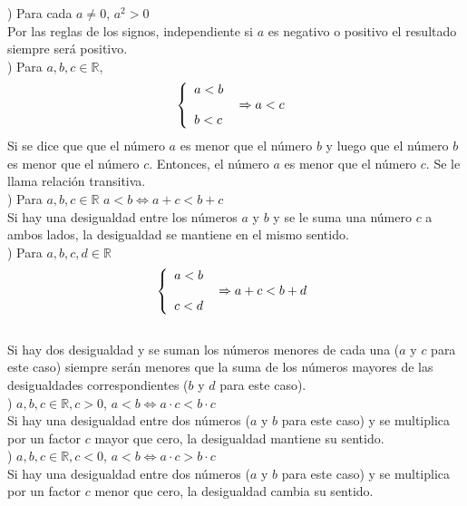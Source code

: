 ) Para cada $a\neq 0$, $a^{2}>0$ \\
Por las reglas de los signos, independiente si $a$ es negativo o positivo el resultado siempre será positivo.\\

) Para $a,b,c\in\mathbb{R}$, 
$$\left\{\begin{array}{ll} 
a<b \\
\hspace{35px}\Rightarrow a<c\\
b<c
\end{array} \right. \\$$
Si se dice que que el número $a$ es menor que el número $b$ y luego que el número $b$ es menor que el número $c$. Entonces, el número $a$ es menor que el número $c$. Se le llama relación transitiva.\\

) Para $a,b,c\in\mathbb{R}$ $a<b\Leftrightarrow a+c<b+c$\\
Si hay una desigualdad entre los números $a$ y $b$ y se le suma una número $c$ a ambos lados, la desigualdad se mantiene en el mismo sentido.\\

) Para $a,b,c,d\in\mathbb{R}$
$$
\left\{\begin{array}{ll}
a<b\\
\hspace{35px} \Rightarrow a+c<b+d\\
c<d
\end{array}\right. $$\\
Si hay dos desigualdad y se suman los números menores de cada una ($a$ y $c$ para este caso) siempre serán menores que la suma de los números mayores de las desigualdades correspondientes ($b$ y $d$ para este caso).\\

) $a,b,c\in\mathbb{R}, c>0$, $a<b\Leftrightarrow a\cdot c< b\cdot c$\\
Si hay una desigualdad entre dos números ($a$ y $b$ para este caso) y se multiplica por un factor $c$ mayor que cero, la desigualdad mantiene su sentido.\\
\newpage
{}) $a,b,c\in\mathbb{R}, c<0$, $a<b\Leftrightarrow a\cdot c> b\cdot c$\\
Si hay una desigualdad entre dos números ($a$ y $b$  para este caso) y se multiplica por un factor $c$ menor que cero, la desigualdad cambia su sentido.\\

